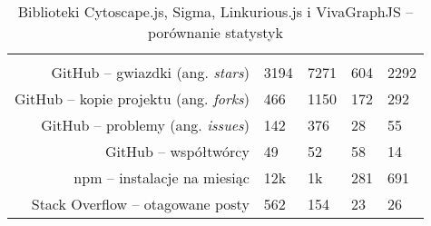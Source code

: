 \begin{table}[H]
\caption{Biblioteki Cytoscape.js, Sigma, Linkurious.js i VivaGraphJS -- porównanie statystyk}
\label{tab:libraries-stats-comparison}
{\renewcommand{\arraystretch}{1.1}
\begin{tabularx}{\textwidth}{ r|Y|Y|Y|Y| } 
 & 
 &  
 &  
 &  
\\

GitHub -- gwiazdki (ang. \textit{stars}) 
 & 3194
 & 7271
 & 604
 & 2292  
\\

GitHub -- kopie projektu (ang. \textit{forks})
 & 466
 & 1150
 & 172  
 & 292  
\\

GitHub -- problemy (ang. \textit{issues})
 & 142
 & 376  
 & 28
 & 55  
\\

GitHub -- współtwórcy
 & 49
 & 52  
 & 58
 & 14  
\\

npm -- instalacje na miesiąc 
 & 12k
 & 1k
 & 281
 & 691  
\\

Stack Overflow -- otagowane posty
 & 562
 & 154
 & 23
 & 26  
\\
\end{tabularx}
}
\end{table}
